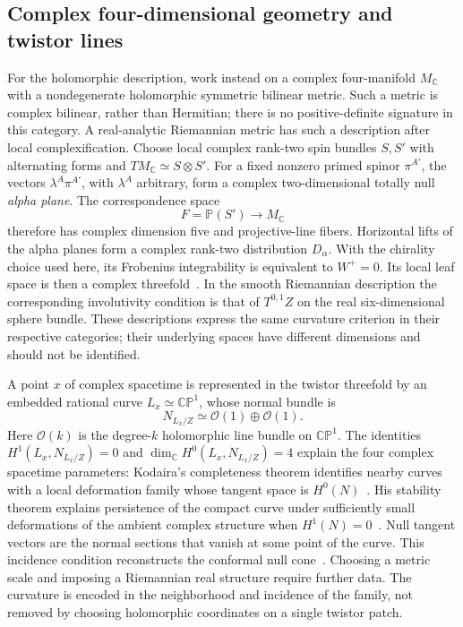\documentclass[11pt]{article}
\numberwithin{equation}{section}
\theoremstyle{definition}
\theoremstyle{remark}
\newcommand{\CP}{\mathbb{CP}}
\begin{document}
\subsection{Complex four-dimensional geometry and twistor lines}

For the holomorphic description, work instead on a complex four-manifold
$M_{\mathbb C}$ with a nondegenerate holomorphic symmetric bilinear metric.
Such a metric is complex bilinear, rather than Hermitian; there is no
positive-definite signature in this category. A real-analytic Riemannian
metric has such a description after local complexification. Choose local
complex rank-two spin bundles $S,S'$ with alternating forms and
$TM_{\mathbb C}\simeq S\otimes S'$. For a fixed nonzero primed spinor
$\pi^{A'}$, the vectors $\lambda^A\pi^{A'}$, with $\lambda^A$ arbitrary,
form a complex two-dimensional totally null \emph{alpha plane}.
The correspondence space
\[
 F=\mathbb P(S')\longrightarrow M_{\mathbb C}
\]
therefore has complex dimension five and projective-line fibers. Horizontal
lifts of the alpha planes form a complex rank-two distribution $D_\alpha$.
With the chirality choice used here, its Frobenius integrability is equivalent
to $W^+=0$. Its local leaf space is then a complex threefold~\cite{Penrose1976}.
In the smooth Riemannian description the corresponding involutivity
condition is that of $T^{0,1}Z$ on the real
six-dimensional sphere bundle. These descriptions express the same curvature
criterion in their respective categories; their underlying spaces have
different dimensions and should not be identified.

A point $x$ of complex spacetime is represented in the twistor threefold
by an embedded rational curve $L_x\simeq\CP^1$, whose normal bundle is
\[
 N_{L_x/Z}\simeq\mathcal O(1)\oplus\mathcal O(1).
\]
Here $\mathcal O(k)$ is the degree-$k$ holomorphic line bundle on
$\CP^1$. The identities
$H^1(L_x,N_{L_x/Z})=0$ and $\dim_{\mathbb C}H^0(L_x,N_{L_x/Z})=4$
explain the four complex spacetime parameters: Kodaira's completeness theorem
identifies nearby curves with a local deformation family whose tangent space
is $H^0(N)$~\cite{Kodaira1962}.
His stability theorem explains persistence of the compact curve under
sufficiently small deformations of the ambient complex structure when
$H^1(N)=0$~\cite{Kodaira1963}. Null tangent vectors are the
normal sections that vanish at some point of the curve. This incidence
condition reconstructs the conformal null cone~\cite{Penrose1976}.
Choosing a metric scale and imposing a Riemannian real structure require
further data. The curvature is encoded in
the neighborhood and incidence of the family, not removed by choosing
holomorphic coordinates on a single twistor patch.
\end{document}
